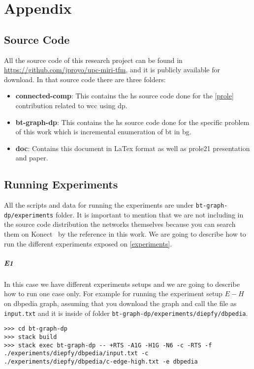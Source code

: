 \chapter{Appendix}
\section{Source Code}
All the source code of this research project can be found in \url{https://github.com/jproyo/upc-miri-tfm}, and it is publicly available for download.
In that source code there are three folders:

\begin{itemize}
  \item \textbf{connected-comp}: This contains the \acrshort{hs} source code done for the \autoref{prole} contribution related to \acrfull{wcc} using \acrshort{dp}.
  \item \textbf{bt-graph-dp}: This contains the \acrshort{hs} source code done for the specific problem of this work which is incremental enumeration of \acrlong{bt} in \acrlong{bg}.
  \item \textbf{doc}: Contains this document in LaTex format as well as \acrshort{prole21} presentation and paper.
\end{itemize}

\section{Running Experiments}
All the scripts and data for running the experiments are under \texttt{bt-graph-dp/experiments} folder.
It is important to mention that we are not including in the source code distribution the networks themselves because you can search them on Konect~\cite{konect} by the reference in this work.
We are going to describe how to run the different experiments exposed on \autoref{experiments}. 

\paragraph{E1} In this case we have different experiments setups and we are going to describe how to run one case only.
For example for running the experiment setup $E-H$ on \acrshort{dbpedia} graph, assuming that you download the graph and call the file as 
\texttt{input.txt} and it is inside of folder \texttt{bt-graph-dp/experiments/diepfy/dbpedia}.
\begin{verbatim}
>>> cd bt-graph-dp
>>> stack build
>>> stack exec bt-graph-dp -- +RTS -A1G -H1G -N6 -c -RTS -f ./experiments/diepfy/dbpedia/input.txt -c ./experiments/diepfy/dbpedia/c-edge-high.txt -e dbpedia
\end{verbatim}


